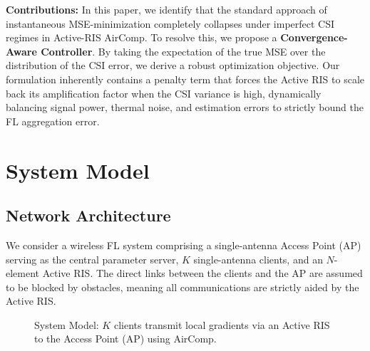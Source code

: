 \documentclass[lettersize,journal]{IEEEtran}
\begin{document}
\textbf{Contributions:} In this paper, we identify that the standard approach of instantaneous MSE-minimization completely collapses under imperfect CSI regimes in Active-RIS AirComp. To resolve this, we propose a \textbf{Convergence-Aware Controller}. By taking the expectation of the true MSE over the distribution of the CSI error, we derive a robust optimization objective. Our formulation inherently contains a penalty term that forces the Active RIS to scale back its amplification factor when the CSI variance is high, dynamically balancing signal power, thermal noise, and estimation errors to strictly bound the FL aggregation error.

\section{System Model}

\subsection{Network Architecture}
We consider a wireless FL system comprising a single-antenna Access Point (AP) serving as the central parameter server, $K$ single-antenna clients, and an $N$-element Active RIS. The direct links between the clients and the AP are assumed to be blocked by obstacles, meaning all communications are strictly aided by the Active RIS.

\begin{figure}[htbp]
\centering
{}
\caption{System Model: $K$ clients transmit local gradients via an Active RIS to the Access Point (AP) using AirComp.}
\label{fig:sys_model}
\end{figure}
\end{document}
